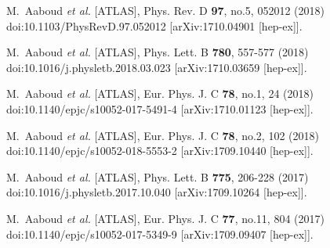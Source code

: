 \begin{thebibliography}{9}
M.~Aaboud \textit{et al.} [ATLAS],
Phys. Rev. D \textbf{97}, no.5, 052012 (2018)
doi:10.1103/PhysRevD.97.052012
[arXiv:1710.04901 [hep-ex]].

M.~Aaboud \textit{et al.} [ATLAS],
Phys. Lett. B \textbf{780}, 557-577 (2018)
doi:10.1016/j.physletb.2018.03.023
[arXiv:1710.03659 [hep-ex]].

M.~Aaboud \textit{et al.} [ATLAS],
Eur. Phys. J. C \textbf{78}, no.1, 24 (2018)
doi:10.1140/epjc/s10052-017-5491-4
[arXiv:1710.01123 [hep-ex]].

M.~Aaboud \textit{et al.} [ATLAS],
Eur. Phys. J. C \textbf{78}, no.2, 102 (2018)
doi:10.1140/epjc/s10052-018-5553-2
[arXiv:1709.10440 [hep-ex]].

M.~Aaboud \textit{et al.} [ATLAS],
Phys. Lett. B \textbf{775}, 206-228 (2017)
doi:10.1016/j.physletb.2017.10.040
[arXiv:1709.10264 [hep-ex]].

M.~Aaboud \textit{et al.} [ATLAS],
Eur. Phys. J. C \textbf{77}, no.11, 804 (2017)
doi:10.1140/epjc/s10052-017-5349-9
[arXiv:1709.09407 [hep-ex]].


\end{thebibliography}
